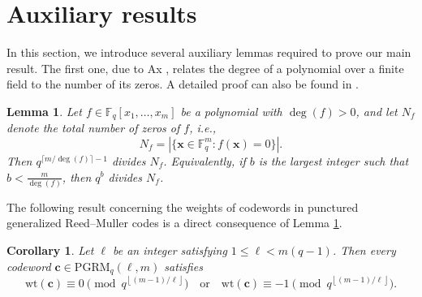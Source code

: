 \documentclass[journal,onecolumn]{IEEEtran}
\newtheorem{lemma}{Lemma}
\newtheorem{corollary}{Corollary}
\newcommand{\F}{\mathbb{F}}
\newcommand{\wt}{\mathrm{wt}}
\newcommand{\PGRM}{\mathrm{PGRM}}
\begin{document}
\section{Auxiliary results}\label{sec:auxiliary}
In this section, we introduce several auxiliary lemmas required to prove our main result. The first one, due to Ax \cite{Ax1964}, relates the degree of a polynomial over a finite field to the number of its zeros. A detailed proof can also be found in \cite[Theorem 5.2]{Hou2018}. 
\begin{lemma}\textnormal{\cite{Ax1964}}\label{thmax}
Let $f\in\F_q[x_1,\ldots,x_m]$ be a polynomial with  $\deg(f)>0$, and let $N_f$ denote the total number of zeros of $f$, i.e., \begin{equation*}
N_f=\left|\{\mathbf{x}\in\F_q^m:f(\mathbf{x})=0\}\right|.
\end{equation*}
Then $q^{\lceil m/  \deg(f)\rceil-1}$ divides $N_f$. Equivalently, if $b$ is the largest integer such that $b<\frac{m}{\deg(f)}$, then $q^b$ divides $N_f$.
\end{lemma}



The following  result concerning the weights of codewords in punctured generalized Reed--Muller codes is a direct consequence of Lemma \ref{thmax}.
\begin{corollary}\label{lemma2}
Let $\ell$ be an integer satisfying $1\leq \ell<m(q-1)$. Then every codeword
$\mathbf{c}\in\PGRM_q(\ell,m)$ satisfies
\begin{equation}\label{contra}
\wt(\mathbf{c})
\equiv 0
\pmod{q^{\left\lfloor (m-1)/\ell\right\rfloor}}
\quad\text{or}\quad
\wt(\mathbf{c})
\equiv -1
\pmod{q^{\left\lfloor (m-1)/\ell\right\rfloor}}.
\end{equation}
\end{corollary}
\end{document}
